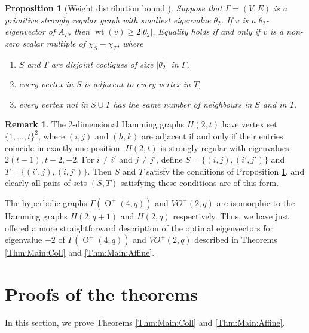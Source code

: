 \documentclass[a4paper]{article}
\newtheorem{prop}[thm]{Proposition}
\theoremstyle{definition}
\newtheorem{rmk}[thm]{Remark}
\renewcommand{\geq}{\geqslant}
\DeclareMathOperator{\wt}{wt}
\DeclareMathOperator{\OO}{O}
\begin{document}
\begin{prop}[Weight distribution bound {\cite{Krotov}}]
 \label{Prop:WDB}
 Suppose that $\Gamma = (V,E)$ is a primitive strongly regular graph with smallest eigenvalue $\theta_2$.
 If $v$ is a $\theta_2$-eigenvector of $A_\Gamma$, then $\wt(v) \geq 2 |\theta_2|$.
 Equality holds if and only if $v$ is a non-zero scalar multiple of $\chi_S - \chi_T$, where
 \begin{enumerate}
  \item $S$ and $T$ are disjoint cocliques of size $|\theta_2|$ in $\Gamma$,
  \item every vertex in $S$ is adjacent to every vertex in $T$,
  \item every vertex not in $S \cup T$ has the same number of neighbours in $S$ and in $T$.
 \end{enumerate}
\end{prop}

\begin{rmk}
 \label{Rmk:Hamming}
 The 2-dimensional Hamming graphs $H(2,t)$ have vertex set $\{1,\dots,t\}^2$, where $(i,j)$ and $(h,k)$ are adjacent if and only if their entries coincide in exactly one position.
 $H(2,t)$ is strongly regular with eigenvalues $2(t-1), t-2, -2$.
 For $i \neq i'$ and $j \neq j'$, define $S = \{(i,j),(i',j')\}$ and $T = \{(i',j),(i,j')\}$.
 Then $S$ and $T$ satisfy the conditions of Proposition \ref{Prop:WDB}, and clearly all pairs of sets $(S,T)$ satisfying these conditions are of this form.
 
 The hyperbolic graphs $\Gamma(\OO^+(4,q))$ and $VO^+(2,q)$ are isomorphic to the Hamming graphs $H(2,q+1)$ and $H(2,q)$ respectively.
 Thus, we have just offered a more straightforward description of the optimal eigenvectors for eigenvalue $-2$ of $\Gamma(\OO^+(4,q))$ and $VO^+(2,q)$ described in Theorems \ref{Thm:Main:Coll} and \ref{Thm:Main:Affine}.
\end{rmk}


\section{Proofs of the theorems}

In this section, we prove Theorems \ref{Thm:Main:Coll} and \ref{Thm:Main:Affine}.
\end{document}
